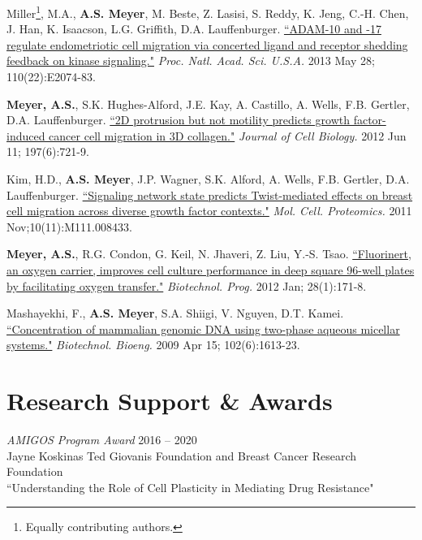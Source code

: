 \documentclass[11pt]{res}
\begin{document}
\begin{resume}
{Miller\footnote{Equally contributing authors.}, M.A., {\bf A.S. Meyer}\footnotemark[\value{footnote}], M. Beste, Z. Lasisi, S. Reddy, K. Jeng, C.-H. Chen, J. Han, K. Isaacson, L.G. Griffith, D.A. Lauffenburger. \href{http://www.ncbi.nlm.nih.gov/pubmed/23674691}{``ADAM-10 and -17 regulate endometriotic cell migration via concerted ligand and receptor shedding feedback on kinase signaling."} {\sl Proc. Natl. Acad. Sci. U.S.A.} 2013 May 28; 110(22):E2074-83.

{\bf Meyer, A.S.}, S.K. Hughes-Alford, J.E. Kay, A. Castillo, A. Wells, F.B. Gertler, D.A. Lauffenburger. \href{http://www.ncbi.nlm.nih.gov/pubmed/22665521}{``2D protrusion but not motility predicts growth factor-induced cancer cell migration in 3D collagen."} {\sl Journal of Cell Biology.} 2012 Jun 11; 197(6):721-9.

Kim, H.D., {\bf A.S. Meyer}, J.P. Wagner, S.K. Alford, A. Wells, F.B. Gertler, D.A. Lauffenburger. \href{http://www.ncbi.nlm.nih.gov/pubmed/21832255}{``Signaling network state predicts Twist-mediated effects on breast cell migration across diverse growth factor contexts."} {\sl Mol. Cell. Proteomics.} 2011 Nov;10(11):M111.008433.

{\bf Meyer, A.S.}, R.G. Condon, G. Keil, N. Jhaveri, Z. Liu, Y.-S. Tsao.  \href{http://www.ncbi.nlm.nih.gov/pubmed/21954223}{``Fluorinert, an oxygen carrier, improves cell culture performance in deep square 96-well plates by facilitating oxygen transfer."} {\sl Biotechnol. Prog.} 2012 Jan; 28(1):171-8.

Mashayekhi, F., {\bf A.S. Meyer}, S.A. Shiigi, V. Nguyen, D.T. Kamei. \href{http://www.ncbi.nlm.nih.gov/pubmed/19061237}{``Concentration of mammalian genomic DNA using two-phase aqueous micellar systems."} {\sl Biotechnol. Bioeng.} 2009 Apr 15; 102(6):1613-23.

}


\clearpage
\section{Research Support \& Awards}

{\sl AMIGOS Program Award} \hfill 2016 -- 2020 \\
Jayne Koskinas Ted Giovanis Foundation and Breast Cancer Research Foundation\\
``Understanding the Role of Cell Plasticity in Mediating Drug Resistance"


\end{resume}
\end{document}

